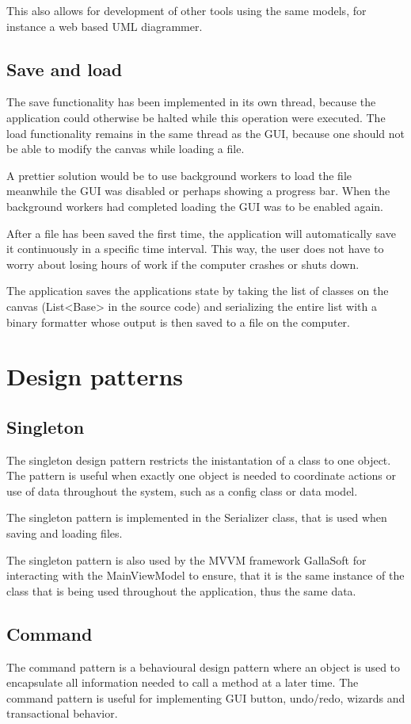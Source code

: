 This also allows for development of other tools using the same models, for instance a web based UML diagrammer.

\subsection{Save and load}
The save functionality has been implemented in its own thread, because the application could otherwise be halted while this operation were executed. The load functionality remains in the same thread as the GUI, because one should not be able to modify the canvas while loading a file.

A prettier solution would be to use background workers to load the file meanwhile the GUI was disabled or perhaps showing a progress bar. When the background workers had completed loading the GUI was to be enabled again.

After a file has been saved the first time, the application will automatically save it continuously in a specific time interval. This way, the user does not have to worry about losing hours of work if the computer crashes or shuts down.

The application saves the applications state by taking the list of classes on the canvas (\textsf{List<Base>} in the source code) and serializing the entire list with a binary formatter whose output is then saved to a file on the computer.

\section{Design patterns}
\label{sec:design_pattern}
\subsection{Singleton}
The singleton design pattern restricts the inistantation of a class to one object.
The pattern is useful when exactly one object is needed to coordinate actions or use of data throughout the system, such as a config class or data model.

The singleton pattern is implemented in the \textsf{Serializer} class, that is used when saving and loading files. 

The singleton pattern is also used by the MVVM framework GallaSoft for interacting with the \textsf{MainViewModel} to ensure, that it is the same instance of the class that is being used throughout the application, thus the same data.

\subsection{Command}
The command pattern is a behavioural design pattern where an object is used to encapsulate all information needed to call a method at a later time.
The command pattern is useful for implementing GUI button, undo/redo, wizards and transactional behavior.

